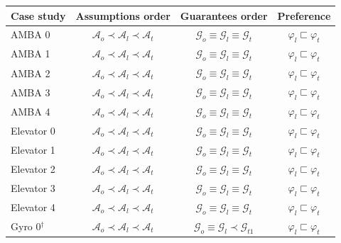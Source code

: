 \begin{table}[h]
\centering
\scriptsize
\setlength{\tabcolsep}{2pt}
\begin{tabular*}{\linewidth}{@{\extracolsep{\fill}}lccc@{}}
\toprule
Case study & Assumptions order & Guarantees order & Preference \\
\midrule
AMBA 0 & $\mathcal{A}_{o}\prec\mathcal{A}_{l}\prec\mathcal{A}_{t}$ & $\mathcal{G}_{o}\equiv\mathcal{G}_{l}\equiv\mathcal{G}_{t}$ & $\varphi_l\sqsubset \varphi_t$ \\
AMBA 1 & $\mathcal{A}_{o}\prec\mathcal{A}_{l}\prec\mathcal{A}_{t}$ & $\mathcal{G}_{o}\equiv\mathcal{G}_{l}\equiv\mathcal{G}_{t}$ & $\varphi_l\sqsubset \varphi_t$ \\
AMBA 2 & $\mathcal{A}_{o}\prec\mathcal{A}_{l}\prec\mathcal{A}_{t}$ & $\mathcal{G}_{o}\equiv\mathcal{G}_{l}\equiv\mathcal{G}_{t}$ & $\varphi_l\sqsubset \varphi_t$ \\
AMBA 3 & $\mathcal{A}_{o}\prec\mathcal{A}_{l}\prec\mathcal{A}_{t}$ & $\mathcal{G}_{o}\equiv\mathcal{G}_{l}\equiv\mathcal{G}_{t}$ & $\varphi_l\sqsubset \varphi_t$ \\
AMBA 4 & $\mathcal{A}_{o}\prec\mathcal{A}_{l}\prec\mathcal{A}_{t}$ & $\mathcal{G}_{o}\equiv\mathcal{G}_{l}\equiv\mathcal{G}_{t}$ & $\varphi_l\sqsubset \varphi_t$ \\
\hline
Elevator 0 & $\mathcal{A}_{o}\prec\mathcal{A}_{l}\prec\mathcal{A}_{t}$ & $\mathcal{G}_{o}\equiv\mathcal{G}_{l}\equiv\mathcal{G}_{t}$ & $\varphi_l\sqsubset \varphi_t$ \\
Elevator 1 & $\mathcal{A}_{o}\prec\mathcal{A}_{l}\prec\mathcal{A}_{t}$ & $\mathcal{G}_{o}\equiv\mathcal{G}_{l}\equiv\mathcal{G}_{t}$ & $\varphi_l\sqsubset \varphi_t$ \\
Elevator 2 & $\mathcal{A}_{o}\prec\mathcal{A}_{l}\prec\mathcal{A}_{t}$ & $\mathcal{G}_{o}\equiv\mathcal{G}_{l}\equiv\mathcal{G}_{t}$ & $\varphi_l\sqsubset \varphi_t$ \\
Elevator 3 & $\mathcal{A}_{o}\prec\mathcal{A}_{l}\prec\mathcal{A}_{t}$ & $\mathcal{G}_{o}\equiv\mathcal{G}_{l}\equiv\mathcal{G}_{t}$ & $\varphi_l\sqsubset \varphi_t$ \\
Elevator 4 & $\mathcal{A}_{o}\prec\mathcal{A}_{l}\prec\mathcal{A}_{t}$ & $\mathcal{G}_{o}\equiv\mathcal{G}_{l}\equiv\mathcal{G}_{t}$ & $\varphi_l\sqsubset \varphi_t$ \\
\hline
Gyro 0$^\dagger$ & $\mathcal{A}_{o}\prec\mathcal{A}_{l}\prec\mathcal{A}_{t}$ & $\mathcal{G}_{o}\equiv\mathcal{G}_{l}\prec\mathcal{G}_{t1}$ & $\varphi_l\sqsubset \varphi_t$ \\

\end{tabular*}
\end{table}
